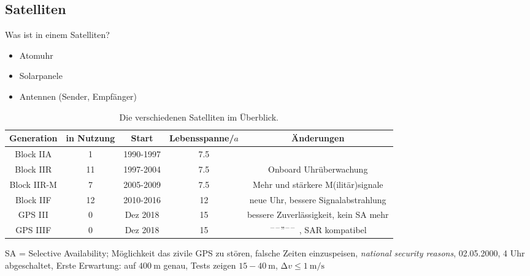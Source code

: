 \subsection{Satelliten}
Was ist in einem Satelliten?
\begin{itemize}
    \item Atomuhr
    \item Solarpanele
    \item Antennen (Sender, Empfänger)
\end{itemize}

\begin{table}[h]
    \caption{Die verschiedenen Satelliten im Überblick.}
    \label{tab:satelliten}
    \begin{tabular}{c S[table-format=2.0] c S[table-format=2.1] c}
        \toprule
        {Generation} & {in Nutzung} & {Start} & {Lebensspanne\;/\;$a$} & {Änderungen} \\
        \midrule
        Block IIA   &  1 & 1990-1997 & 7.5 & \\
        Block IIR   & 11 & 1997-2004 & 7.5 & Onboard Uhrüberwachung \\
        Block IIR-M &  7 & 2005-2009 & 7.5 & Mehr und stärkere M(ilitär)signale \\
        Block IIF   & 12 & 2010-2016 & 12  & neue Uhr, bessere Signalabstrahlung \\
        GPS III     &  0 & Dez 2018  & 15  & bessere Zuverlässigkeit, kein SA mehr \\
        GPS IIIF    &  0 & Dez 2018  & 15  & $^{\---}"^{\---}$ , SAR kompatibel \\
        \bottomrule
    \end{tabular}
\end{table}
SA = Selective Availability; Möglichkeit das zivile GPS zu stören, falsche Zeiten einzuspeisen, \textit{national security reasons}, 02.05.2000, 4 Uhr abgeschaltet,
Erste Erwartung: auf $\SI{400}{\meter}$ genau, Tests zeigen $15 - \SI{40}{\meter}$, $\increment v\leq \SI{1}{\meter\per\second}$
